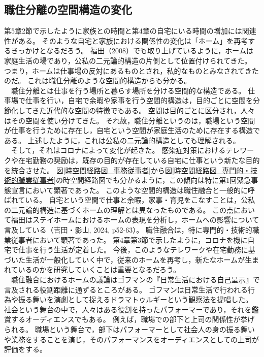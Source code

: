 \documentclass[paper={210mm,297mm},line_length=35zw,number_of_lines=31,head_space=30mm,gutter=40mm,baselineskip=2.0zw,headfoot_verticalposition=1.5zw]{jlreq}
\begin{document}
\subsection{職住分離の空間構造の変化}

第5章2節で示したように家族との時間と第4章の自宅にいる時間の増加には関連性がある。
そのような自宅と家族における関係性の変化は「ホーム」を再考するきっかけとなるだろう。
福田（2008）でも取り上げているように，ホームは家庭生活の場であり，公私の二元論的構造の片側として位置付けられてきた。
つまり，ホームは仕事場の反対にあるものとされ，私的なものとみなされてきたのだ。
これは職住分離のような空間的構造からも分かる。\\
　職住分離とは仕事を行う場所と暮らす場所を分ける空間的な構造である。
仕事場で仕事を行い，自宅で余暇や家事を行う空間的構造は，目的ごとに空間を分節化してきた近代的な空間の特徴でもある。
空間は目的ごとに区分され，人々はその空間を使い分けてきた。
それ故，職住分離というのは，職場という空間が仕事を行うために存在し，自宅という空間が家庭生活のために存在する構造である。
上述したように，これは公私の二元論的構造としても理解される。\\
　そして，それはコロナによって変化が起きた。
感染症対策におけるテレワークや在宅勤務の奨励は，既存の目的が存在している自宅に仕事という新たな目的を統合させた。
図\ref{時空間経路図_事務従事者}から図\ref{時空間経路図_専門的・技術的職業従事者}の時空間経路図でも分かるように，この傾向は特に第1回緊急事態宣言において顕著であった。
このような空間的構造は職住融合と一般的に呼ばれている。
自宅という空間で仕事と余暇，家事・育児をこなすことは，公私の二元論的構造に基づくホームの理解とは異なったものである。
この点において福田はステイホームにおけるホームの表現を分析し，ホームへの影響について言及している（吉田・影山, 2024, p52-63）。
職住融合は，特に専門的・技術的職業従事者において顕著であった。
第4章第3節で示したように，コロナを機に自宅で仕事を行う生活が定着した。
今後，このようなテレワークや在宅勤務に基づいた生活が一般化していく中で，従来のホームを再考し，新たなホームが生まれているのかを研究していくことは重要となるだろう。\\
　職住融合におけるホームの議論はゴフマンの『日常生活における自己呈示』で言及される役割距離に通ずるところがある。
ゴフマンは日常生活で行われる行為や振る舞いを演劇として捉えるドラマトゥルギーという観察法を提唱した。
社会という舞台の中で，人々はある役割を持ったパフォーマーであり，それを鑑賞するオーディエンスでもある。
例えば，職場での部下と上司の関係性が挙げられる。
職場という舞台で，部下はパフォーマーとして社会人の身の振る舞いや業務をすることを演じ，そのパフォーマンスをオーディエンスとしての上司が評価をする。
\end{document}
